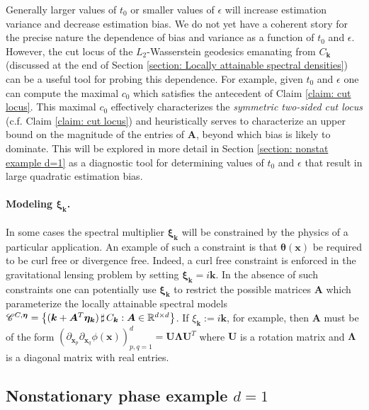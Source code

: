 \documentclass[10pt,noinfoline]{imsart}
\newcommand{\bs}{\boldsymbol}
\begin{document}
Generally larger values of $t_0$ or smaller values of $\epsilon$ will increase estimation variance and decrease estimation bias. We do not yet have a coherent story for the precise nature the dependence of bias and variance as a function of $t_0$ and $\epsilon$. However,  the cut locus of the $L_2$-Wasserstein geodesics emanating from $C_{\bs k}$  (discussed at the end of Section \ref{section: Locally attainable spectral densities}) can be a useful tool for probing this dependence. For example, given $t_0$ and $\epsilon$ one can compute the maximal $c_0$ which satisfies the antecedent of Claim \ref{claim: cut locus}. This maximal $c_0$ effectively characterizes the \textit{symmetric two-sided cut locus} (c.f. Claim \ref{claim: cut locus}) and heuristically serves to characterize an upper bound on the magnitude of the entries of $\bs A$, beyond which bias is likely to dominate. 
This will be explored in more detail in Section \ref{section: nonstat example d=1} as a diagnostic tool for determining values of  $t_0$ and $\epsilon$ that result in  large quadratic estimation bias. 




\paragraph{Modeling $\bs \xi_{\bs k}$.} In some cases the spectral multiplier $\bs \xi_{\bs k}$ will be constrained by the physics of a particular application. An example of such a constraint is that $\bs \theta(\bs x)$ be required to be curl free or divergence free. Indeed, a curl free constraint is enforced in the gravitational lensing problem  by setting $\bs \xi_{\bs k}=i\bs k$. In the absence of such constraints one can potentially use $\bs \xi_{\bs k}$ to restrict the possible matrices $\bs A$ which parameterize  the locally attainable spectral models  $\mathscr C^{C,\bs\eta}= \big\{ (\bs k+ \bs A^T \bs\eta_{\bs k})\,\sharp\, C_{\bs k}: \bs A \in \Bbb R^{d\times d}\big\}$.   If $\xi_{\bs k}:= i\bs k$, for example, then $\bs A$ must be of the form $(\partial_{\bs x_p}\partial_{\bs x_q}\phi(\bs x))_{p,q=1}^d = \bs U\bs \Lambda \bs U^T$ where $\bs U$ is a rotation matrix and $\bs \Lambda$ is a diagonal matrix with real entries. 


\subsection{Nonstationary phase example $d=1$}
\end{document}
